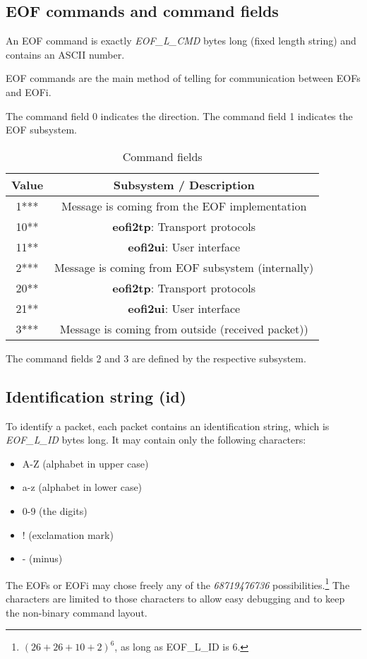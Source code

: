 \documentclass[12pt,a4paper]{book}
\begin{document}
\subsection{EOF commands and command fields}
An EOF command is exactly \emph{EOF\_L\_CMD} bytes long (fixed length string)
and contains an ASCII number.

EOF commands are the main method of telling for communication between
EOFs and EOFi.

The command field 0 indicates the direction.
The command field 1 indicates the EOF subsystem.
\begin{longtable}{|c|c|}
\caption{Command fields}\\
\hline
\textbf{Value} & \textbf{Subsystem} / \textbf{Description}\\
\hline
1*** & Message is coming from the EOF implementation\\
\hline
10** & \textbf{eofi2tp}: Transport protocols\\
\hline
11** & \textbf{eofi2ui}: User interface\\
\hline
2*** & Message is coming from EOF subsystem (internally)\\
\hline
20** & \textbf{eofi2tp}: Transport protocols\\
\hline
21** & \textbf{eofi2ui}: User interface\\
\hline
3*** & Message is coming from outside (received packet))\\
\hline
\end{longtable}
The command fields 2 and 3 are defined by the respective subsystem.
\subsection{Identification string (id)}
\label{idn}
To identify a packet, each packet contains an identification string,
which is \emph{EOF\_L\_ID} bytes long. It may contain only the
following characters:
\begin{itemize}
\item A-Z (alphabet in upper case)
\item a-z (alphabet in lower case)
\item 0-9 (the digits)
\item ! (exclamation mark)
\item - (minus)
\end{itemize}
The EOFs or EOFi may chose freely any of the \emph{68719476736}
possibilities.\footnote{$(26+26+10+2)^6$, as long as EOF\_L\_ID is 6.}
The characters are limited to those characters to allow easy debugging
and to keep the non-binary command layout.
\end{document}
